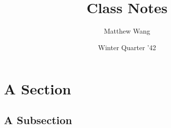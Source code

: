 \documentclass{article}
\title{Class Notes}
\author{Matthew Wang}
\date{Winter Quarter '42}
\begin{document}
\maketitle

\tableofcontents

\section{A Section}

\subsection{A Subsection}
\end{document}
